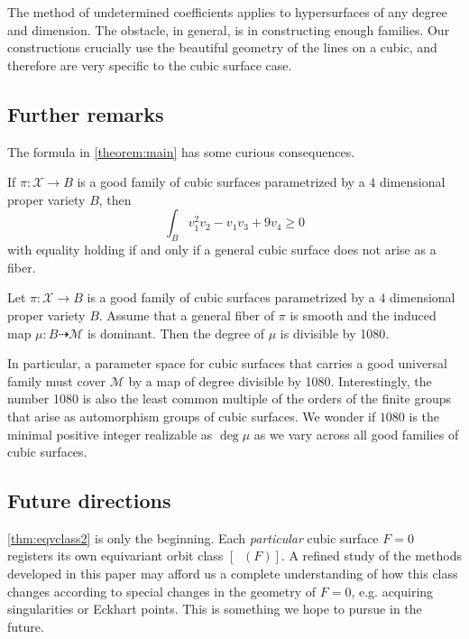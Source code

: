 \documentclass[12pt,reqno]{amsart}
\DeclareMathOperator{\Orb}{\overline{Orb}}
\renewcommand{\to}{{\longrightarrow}}
\numberwithin{equation}{section}
\newcommand{\cX}{\mathcal{X}}
\begin{document}
The method of undetermined coefficients applies to hypersurfaces of
any degree and dimension.  The obstacle, in general, is in
constructing enough families.  Our constructions crucially use the
beautiful geometry of the lines on a cubic, and therefore are very
specific to the cubic surface case.

\subsection{Further remarks}
The formula in \autoref{theorem:main} has some curious consequences.
\begin{corollary}
  \label{cor:ineq} If $\pi \colon \cX \to B$ is a good family of cubic
  surfaces parametrized by a $4$ dimensional proper variety $B$,
  then $$\int_{B} v_{1}^{2}v_{2} - v_{1}v_3 + 9v_{4} \geq 0$$ with
  equality holding if and only if a general cubic surface does not
  arise as a fiber.
\end{corollary}

\begin{corollary}
  \label{cor:ineq} Let $\pi \colon \cX \to B$ is a good family of cubic
  surfaces parametrized by a $4$ dimensional proper variety $B$.
  Assume that a general fiber of $\pi$ is smooth and the induced map
  $\mu \colon B \dashrightarrow \mathcal M$ is dominant.
  Then the degree of $\mu$ is divisible by 1080.
\end{corollary}
In particular, a parameter space for cubic surfaces that carries a
good universal family must cover $\mathcal M$ by a map of degree
divisible by 1080.  Interestingly, the number 1080 is also the least
common multiple of the orders of the finite groups that arise as
automorphism groups of cubic surfaces.
We wonder if $1080$ is the minimal positive integer realizable as $\deg \mu$ as we vary
across all good families of cubic surfaces.

\subsection{Future directions}

\autoref{thm:eqvclass2} is only the beginning.  Each {\sl particular}
cubic surface $F=0$ registers its own equivariant orbit class
$[\Orb(F)]$.  A refined study of the methods developed in this paper
may afford us a complete understanding of how this class changes
according to special changes in the geometry of $F=0$, e.g. acquiring
singularities or Eckhart points.  This is something we hope to pursue
in the future.
\end{document}
